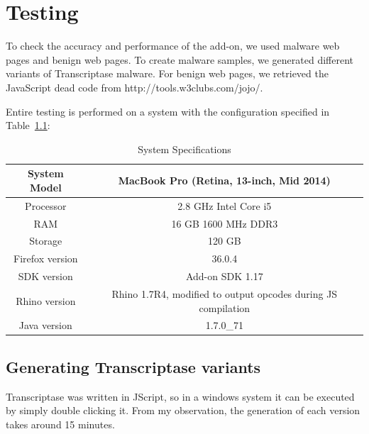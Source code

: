 \chapter{Testing} \label{chap:testing}

To check the accuracy and performance of the add-on, we used malware web pages and benign web pages. To create malware samples, we generated different variants of Transcriptase malware. For benign web pages, we retrieved the JavaScript dead code from http://tools.w3clubs.com/jojo/.

Entire testing is performed on a system with the configuration specified in Table~\ref{tab:title}:
\begin {table}[h]
\caption {System Specifications} \label{tab:title} 
  \begin{tabular}{|c|c|} 
\midrule
System Model & MacBook Pro (Retina, 13-inch, Mid 2014)\\
\midrule
Processor & 2.8 GHz Intel Core i5\\
\midrule
RAM & 16 GB 1600 MHz DDR3\\
\midrule
Storage & 120 GB\\
\midrule
Firefox version & 36.0.4\\
\midrule
SDK version & Add-on SDK 1.17\\
\midrule
Rhino version & Rhino 1.7R4, modified to output opcodes during JS compilation\\
\midrule
Java version & 1.7.0\_71\\
\midrule
\end{tabular}
 \end {table}

\section{Generating Transcriptase variants}

Transcriptase was written in JScript, so in a windows system it can be executed by simply double clicking it. From my observation, the generation of each version takes around 15 minutes. 

